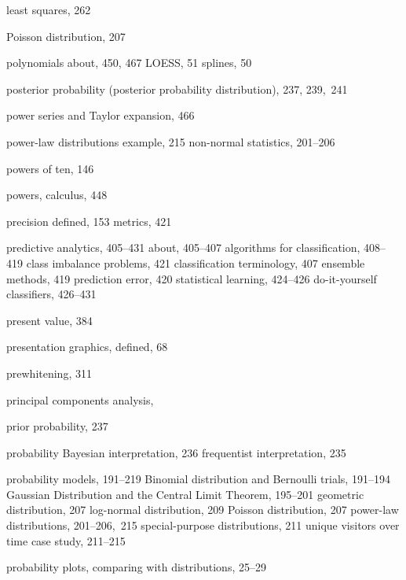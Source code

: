 \documentclass{Oreilly5980006}
\begin{document}
\begin{theindex}
\subitem least squares, 262
  \item Poisson distribution, 207
  \item polynomials
    \subitem about, 450, 467
    \subitem LOESS, 51
    \subitem splines, 50
  \item posterior probability (posterior probability distribution), 237, 
		239,~241
  \item power series and Taylor expansion, 466
  \item power-law distributions
    \subitem example, 215
    \subitem non-normal statistics, 201--206
  \item powers of ten, 146
  \item powers, calculus, 448
  \item precision
    \subitem defined, 153
    \subitem metrics, 421
  \item predictive analytics, 405--431
    \subitem about, 405--407
    \subitem algorithms for classification, 408--419
    \subitem class imbalance problems, 421
    \subitem classification terminology, 407
    \subitem ensemble methods, 419
    \subitem prediction error, 420
    \subitem statistical learning, 424--426
    \subitem   do-it-yourself classifiers, 426--431
  \item present value, 384
  \item presentation graphics, defined, 68
  \item prewhitening, 311
  \item principal components analysis, %
  \item prior probability, 237
  \item probability
    \subitem Bayesian interpretation, 236
    \subitem frequentist interpretation, 235
  \item probability models, 191--219
    \subitem Binomial distribution and Bernoulli trials, 191--194
    \subitem Gaussian Distribution and the Central Limit Theorem, 
		195--201
    \subitem geometric distribution, 207
    \subitem log-normal distribution, 209
    \subitem Poisson distribution, 207
    \subitem power-law distributions, 201--206,~215
    \subitem special-purpose distributions, 211
    \subitem unique visitors over time case study, 211--215
  \item probability plots, comparing with distributions, 25--29

\end{theindex}
\end{document}
